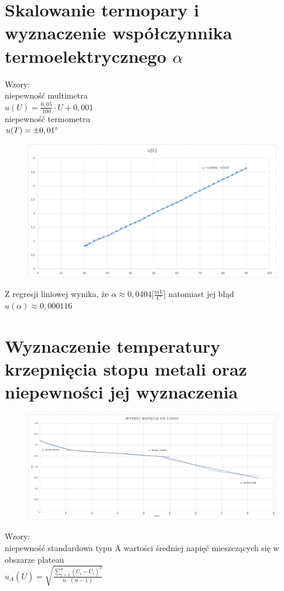 \documentclass{article}
\begin{document}
\section{Skalowanie termopary i wyznaczenie współczynnika termoelektrycznego $\alpha$}
Wzory:\\
niepewność multimetra\\
$u(U)=\frac{0,05}{100}\cdot U+0,001$\\

niepewność termometru\\
$u(T)=\pm0,01\degree$\\
\begin{figure}[h]
    \includegraphics[width=13cm]{wykres.PNG}
\end{figure}
Z regresji liniowej wynika, że $\alpha\approx0,0404\lbrack\frac{mV}{C}\rbrack$ natomiast jej błąd $u(\alpha)\approx0,000116$\\
\section{Wyznaczenie temperatury krzepnięcia stopu metali oraz niepewności jej
wyznaczenia}
\begin{figure}[h]
    \includegraphics[width=13cm]{wykres2.PNG}
\end{figure}
Wzory:\\
 niepewność standardowa typu A wartości
średniej napięć mieszczących się w obszarze plateau\\
$u_{A}(\overline{U})=\sqrt{\frac{\sum_{i=1}^{n}(U_{i}-\overline{U}_{i})^2}{n\cdot(n-1)}}$\\
\end{document}

